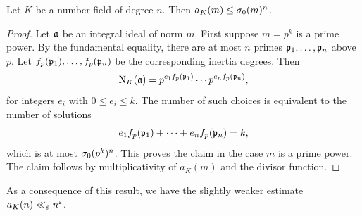       \begin{proposition}\label{equ:ideals_of_fixed_norm_bound}
        Let \(K\) be a number field of degree \(n\). Then \(a_{K}(m) \le \sigma_{0}(m)^{n}\).
      \end{proposition}
      \begin{proof}
        Let \(\mathfrak{a}\) be an integral ideal of norm \(m\). First suppose \(m = p^{k}\) is a prime power. By the fundamental equality, there are at most \(n\) primes \(\mathfrak{p}_{1},\ldots,\mathfrak{p}_{n}\) above \(p\). Let \(f_{p}(\mathfrak{p}_{1}),\ldots,f_{p}(\mathfrak{p}_{n})\) be the corresponding inertia degrees. Then
        \[
          \operatorname{\mathrm{N}}_{K}(\mathfrak{a}) = p^{e_{1}f_{p}(\mathfrak{p}_{1})} \cdots p^{e_{n}f_{p}(\mathfrak{p}_{n})},
        \]
        for integers \(e_{i}\) with \(0 \le e_{i} \le k\). The number of such choices is equivalent to the number of solutions
        \[
          e_{1}f_{p}(\mathfrak{p}_{1})+\cdots+e_{n}f_{p}(\mathfrak{p}_{n}) = k,
        \]
        which is at most \(\sigma_{0}(p^{k})^{n}\). This proves the claim in the case \(m\) is a prime power. The claim follows by multiplicativity of \(a_{K}(m)\) and the divisor function.
      \end{proof}

      As a consequence of this result, we have the slightly weaker estimate \(a_{K}(n) \ll_{\varepsilon} n^{\varepsilon}\).